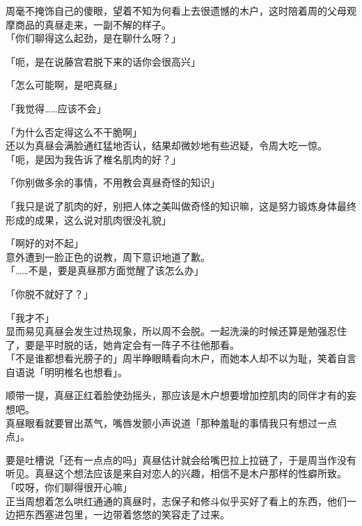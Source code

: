 周毫不掩饰自己的傻眼，望着不知为何看上去很遗憾的木户，这时陪着周的父母观摩商品的真昼走来，一副不解的样子。\\

「你们聊得这么起劲，是在聊什么呀？」

「呃，是在说藤宫君脱下来的话你会很高兴」

「怎么可能啊，是吧真昼」

「我觉得……应该不会」

「为什么否定得这么不干脆啊」\\

还以为真昼会满脸通红猛地否认，结果却微妙地有些迟疑，令周大吃一惊。\\

「呃，是因为我告诉了椎名肌肉的好？」

「你别做多余的事情，不用教会真昼奇怪的知识」

「我只是说了肌肉的好，别把人体之美叫做奇怪的知识嘛，这是努力锻炼身体最终形成的成果，这么说对肌肉很没礼貌」

「啊好的对不起」\\

意外遭到一脸正色的说教，周下意识地道了歉。\\

「……不是，要是真昼那方面觉醒了该怎么办」

「你脱不就好了？」

「我才不」\\

显而易见真昼会发生过热现象，所以周不会脱。一起洗澡的时候还算是勉强忍住了，要是平时脱的话，她肯定会有一阵子不往他那看。\\

「不是谁都想看光膀子的」周半睁眼睛看向木户，而她本人却不以为耻，笑着自言自语说「明明椎名也想看」。

顺带一提，真昼正红着脸使劲摇头，那应该是木户想要增加控肌肉的同伴才有的妄想吧。\\

真昼眼看就要冒出蒸气，嘴唇发颤小声说道「那种羞耻的事情我只有想过一点点」。

要是吐槽说「还有一点点的吗」真昼估计就会给嘴巴拉上拉链了，于是周当作没有听见。真昼这个想法应该是来自对恋人的兴趣，相信不是木户那样的性癖所致。\\

「哎呀，你们聊得很开心嘛」\\

正当周想着怎么哄红通通的真昼时，志保子和修斗似乎买好了看上的东西，他们一边把东西塞进包里，一边带着悠悠的笑容走了过来。\\

